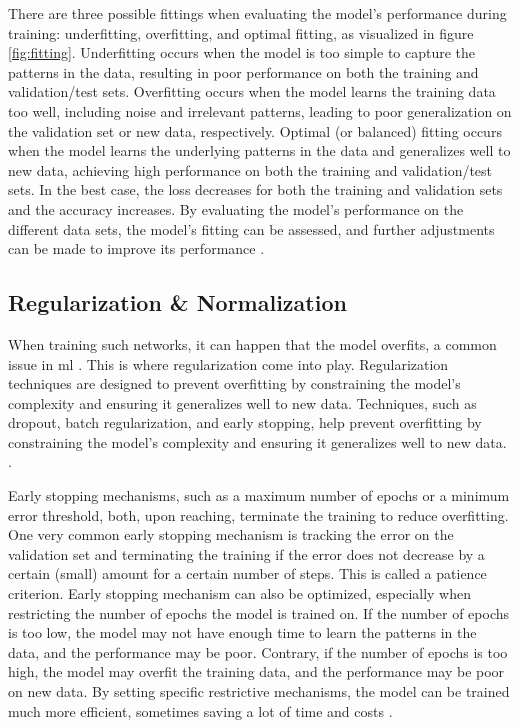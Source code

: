 There are three possible fittings when evaluating the model's performance during training: underfitting, overfitting, and optimal fitting, as visualized in figure \ref{fig:fitting}. Underfitting occurs when the model is too simple to capture the patterns in the data, resulting in poor performance on both the training and validation/test sets. Overfitting occurs when the model learns the training data too well, including noise and irrelevant patterns, leading to poor generalization on the validation set or new data, respectively. Optimal (or balanced) fitting occurs when the model learns the underlying patterns in the data and generalizes well to new data, achieving high performance on both the training and validation/test sets. In the best case, the loss decreases for both the training and validation sets and the accuracy increases. By evaluating the model's performance on the different data sets, the model's fitting can be assessed, and further adjustments can be made to improve its performance \autocite{Alzubaidi.Zhang.ea2021,Bernard2021,Szeliski2022,Zhang.Lipton.ea2023}.

\subsection{Regularization \& Normalization}
\label{subsec:regularization}

When training such networks, it can happen that the model overfits, a common issue in \gls{ml} \autocite{Szeliski2022}. This is where regularization come into play. Regularization techniques are designed to prevent overfitting by constraining the model's complexity and ensuring it generalizes well to new data. Techniques, such as dropout, batch regularization, and early stopping, help prevent overfitting by constraining the model's complexity and ensuring it generalizes well to new data. \autocite{Alzubaidi.Zhang.ea2021,Bernard2021,Nielsen2015,Szeliski2022}.

Early stopping mechanisms, such as a maximum number of epochs or a minimum error threshold, both, upon reaching, terminate the training to reduce overfitting. One very common early stopping mechanism is tracking the error on the validation set and terminating the training if the error does not decrease by a certain (small) amount for a certain number of steps. This is called a patience criterion. Early stopping mechanism can also be optimized, especially when restricting the number of epochs the model is trained on. If the number of epochs is too low, the model may not have enough time to learn the patterns in the data, and the performance may be poor. Contrary, if the number of epochs is too high, the model may overfit the training data, and the performance may be poor on new data. By setting specific restrictive mechanisms, the model can be trained much more efficient, sometimes saving a lot of time and costs \autocite{Goodfellow.Bengio.ea2016,Zhang.Lipton.ea2023}.

